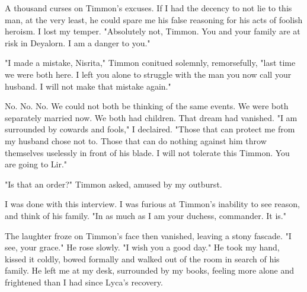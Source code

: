 \documentclass{article}
\begin{document}
A thousand curses on Timmon's excuses. If I had the decency to not lie to this man, at the very least, he could spare me his false reasoning for his acts of foolish heroism. I lost my temper. "Absolutely not, Timmon. You and your family are at risk in Deyalorn. I am a danger to you."

"I made a mistake, Nisrita," Timmon conitued solemnly, remorsefully, "last time we were both here. I left you alone to struggle with the man you now call your husband. I will not make that mistake again."

No. No. No. We could not both be thinking of the same events. We were both separately married now. We both had children. That dream had vanished. "I am surrounded by cowards and fools," I declaired. "Those that can protect me from my husband chose not to. Those that can do nothing against him throw themselves uselessly in front of his blade. I will not tolerate this Timmon. You are going to Lir."

"Is that an order?" Timmon asked, amused by my outburst.

I was done with this interview. I was furious at Timmon's inability to see reason, and think of his family. "In as much as I am your duchess, commander. It is."

The laughter froze on Timmon's face then vanished, leaving a stony fascade. "I see, your grace." He rose slowly. "I wish you a good day." He took my hand, kissed it coldly, bowed formally and walked out of the room in search of his family. He left me at my desk, surrounded by my books, feeling more alone and frightened than I had since Lyca's recovery.
\end{document}
